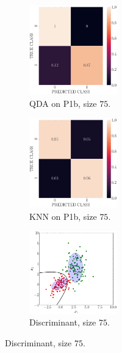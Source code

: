 \documentclass[11pt, a4 paper]{article}
\begin{document}
\begin{figure}[!htbp]
\quad    
    \begin{subfigure}[!htbp]{0.24\textwidth}
       \centering
       \includegraphics[width=1.5in]{../results/ex1/conf_mtx_QD_ML_dataset_P1b_size_75.pdf}
       \caption{QDA on P1b, size $75$.}
       \label{fig:KNN_P1b_75}
    \end{subfigure}
\quad    
    \begin{subfigure}[!htbp]{0.24\textwidth}
       \centering
       \includegraphics[width=1.5in]{../results/ex1/conf_mtx_KNN_dataset_P1b_size_75.pdf}
       \caption{KNN on P1b, size $75$.}
       \label{fig:KNN_P1b_75}
    \end{subfigure}
\quad
    \begin{subfigure}[!htbp]{0.24\textwidth}
       \centering
       \includegraphics[width=1.5in]{../results/ex1/samples_QD_ML_dataset_P1b_size_75.pdf}
       \caption{Discriminant, size $75$.}
       \label{fig:KNN_P1b_75}
    \end{subfigure}
    

\end{figure}
\end{document}
